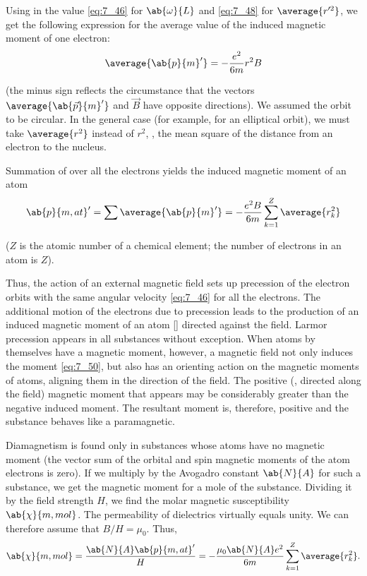 Using in  the value \eqref{eq:7_46} for $\ab{\omega}{L}$ and \eqref{eq:7_48} for $\average{r'^2}$, we get the following expression for the average value of the induced magnetic moment of one electron:
\begin{equation}\label{eq:7_49}
    \average{\ab{p}{m}'} = - \frac{e^2}{6m}r^2 B
\end{equation}

\noindent
(the minus sign reflects the circumstance that the vectors $\average{\ab{\vec{p}}{m}'}$ and $\vec{B}$ have opposite directions).
We assumed the orbit to be circular.
In the general case (for example, for an elliptical orbit), we must take $\average{r^2}$ instead of $r^2$, \ie, the mean square of the distance from an electron to the nucleus.

Summation of  over all the electrons yields the induced magnetic moment of an atom
\begin{equation}\label{eq:7_50}
    \ab{p}{m,at}' = \sum \average{\ab{p}{m}'} = - \frac{e^2 B}{6m} \sum_{k=1}^Z \average{r^2_k}
\end{equation}

\noindent
($Z$ is the atomic number of a chemical element; the number of electrons in an atom is $Z$).

Thus, the action of an external magnetic field sets up precession of the electron orbits with the same angular velocity \eqref{eq:7_46} for all the electrons.
The additional motion of the electrons due to precession leads to the production of an induced magnetic moment of an atom [] directed against the field.
Larmor precession appears in all substances without exception.
When atoms by themselves have a magnetic moment, however, a magnetic field not only induces the moment \eqref{eq:7_50}, but also has an orienting action on the magnetic moments of atoms, aligning them in the direction of the field.
The positive (\ie, directed along the field) magnetic moment that appears may be considerably greater than the negative induced moment.
The resultant moment is, therefore, positive and the substance behaves like a paramagnetic.

Diamagnetism is found only in substances whose atoms have no magnetic moment (the vector sum of the orbital and spin magnetic moments of the atom electrons is zero).
If we multiply  by the Avogadro constant $\ab{N}{A}$ for such a substance, we get the magnetic moment for a mole of the substance.
Dividing it by the field strength $H$, we find the molar magnetic susceptibility $\ab{\chi}{m,mol}$.
The permeability of dielectrics virtually equals unity.
We can therefore assume that $B/H = \mu_0$.
Thus,
\begin{equation}\label{eq:7_51}
    \ab{\chi}{m,mol} = \frac{\ab{N}{A}\ab{p}{m,at}'}{H} = - \frac{\mu_0 \ab{N}{A} e^2}{6m} \sum_{k=1}^Z \average{r^2_k}.
\end{equation}

